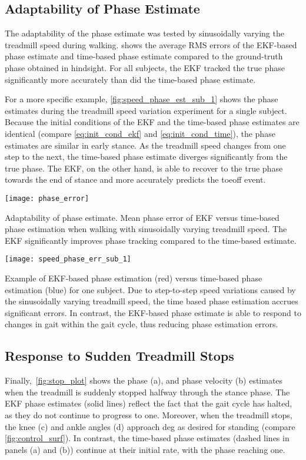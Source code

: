 \subsection{Adaptability of Phase Estimate}

The adaptability of the phase estimate was tested by sinusoidally varying the
treadmill speed during walking.  shows the
average RMS errors of the EKF-based phase estimate and time-based phase estimate
compared to the ground-truth phase obtained in hindsight. For all subjects, the
EKF tracked the true phase significantly more accurately than did the time-based
phase estimate.

For a more specific example, \cref{fig:speed_phase_est_sub_1} shows the phase
estimates during the treadmill speed variation experiment for a single subject.
Because the initial conditions of the EKF and the time-based phase estimates are
identical (compare \cref{eq:init_cond_ekf} and \cref{eq:init_cond_time}), the
phase estimates are similar in early stance. As the treadmill speed changes from
one step to the next, the time-based phase estimate diverges significantly from
the true phase. The EKF, on the other hand, is able to recover to the true phase
towards the end of stance and more accurately predicts the toeoff event.
\begin{marginfigure}
    \centering
    \texttt{[image: phase\_error]} 
    \caption{Adaptability of phase estimate. Mean phase error of EKF versus
    time-based phase estimation when walking with sinusoidally varying treadmill
    speed. The EKF significantly improves phase tracking compared to the
    time-based estimate.}\label{fig:speed_phase_err_mean}
\end{marginfigure}
\begin{marginfigure}
    \centering
    \texttt{[image: speed\_phase\_err\_sub\_1]} \caption{Example
    of EKF-based phase estimation (red) versus time-based phase estimation
    (blue) for one subject. Due to step-to-step speed variations caused by the
    sinusoidally varying treadmill speed, the time based phase estimation
    accrues significant errors.  In contrast, the EKF-based phase estimate is
    able to respond to changes in gait within the gait cycle, thus reducing
    phase estimation errors.}\label{fig:speed_phase_est_sub_1}
\end{marginfigure}

\subsection{Response to Sudden Treadmill Stops}

Finally,~\cref{fig:stop_plot} shows the phase (a), and phase velocity (b)
estimates when the treadmill is suddenly stopped halfway through the stance
phase. The EKF phase estimates (solid lines) reflect the fact that the gait
cycle has halted, as they do not continue to progress to one. Moreover, when
the treadmill stops, the knee (c) and ankle angles (d) approach \unit[5]{deg} as
desired for standing (compare \cref{fig:control_surf}). In contrast, the
time-based phase estimates (dashed lines in panels (a) and (b)) continue at
their initial rate, with the phase reaching one. 

